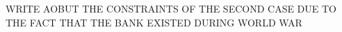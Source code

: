\documentclass[11pt,a4paper]{article}
\begin{document}
{{WRITE AOBUT THE CONSTRAINTS OF THE SECOND CASE DUE TO THE FACT THAT THE BANK EXISTED DURING WORLD WAR





}}
\end{document}
